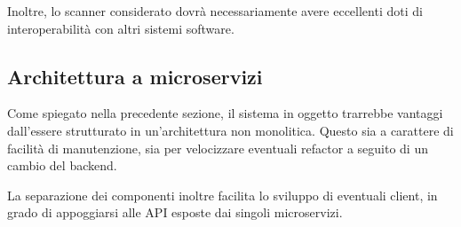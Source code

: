 Inoltre, lo scanner considerato dovrà necessariamente avere eccellenti doti di interoperabilità con altri sistemi software.

\subsection{Architettura a microservizi}
\label{microservices}
Come spiegato nella precedente sezione, il sistema in oggetto trarrebbe vantaggi dall'essere strutturato in un'architettura non monolitica. Questo sia a carattere di facilità di manutenzione, sia per velocizzare eventuali refactor a seguito di un cambio del backend.

La separazione dei componenti inoltre facilita lo sviluppo di eventuali client, in grado di appoggiarsi alle API esposte dai singoli microservizi.
